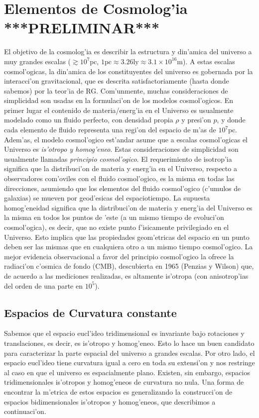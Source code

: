 \chapter{Elementos de Cosmolog'ia ***PRELIMINAR***}\label{cap:cosmo}
El objetivo de la cosmolog'ia es describir la estructura y din'amica del universo a muy grandes escalas ($\gtrsim 10^{7}\text{pc}$, $1\text{pc}\approx 3.26\text{ly}\approx 3.1\times 10^{16}\text{m}$). A estas escalas cosmol'ogicas, la din'amica de los constituyentes del universo es gobernada por la interacci'on gravitacional, que es descrita satisfactoriamente (hasta donde sabemos) por la teor'ia de RG.
Com'unmente, muchas consideraciones de simplicidad son usadas en la formulaci'on de los modelos cosmol'ogicos. 
En primer lugar el contenido de materia/energ'ia en el Universo es usualmente modelado como un fluido perfecto, 
con densidad propia $\rho$ y presi'on $p$, y donde cada elemento de fluido representa una regi'on del espacio de m'as de $10^{7}\text{pc}$. Adem'as, el modelo cosmol'ogico est'andar asume que a escalas cosmol'ogicas el Universo es \textit{is'otropo y homog'eneo}. Estas consideraciones de simplicidad son usualmente llamadas \textit{principio cosmol'ogico}. El requerimiento de isotrop'ia significa que la distribuci'on de materia y energ'ia en el Universo, respecto a observadores com'oviles con el fluido cosmol'ogico, es la misma en todas las direcciones, asumiendo que los elementos del fluido cosmol'ogico (c'umulos de galaxias) se mueven por geod'esicas del espaciotiempo.
La supuesta homog'eneidad significa que la distribuci'on de materia y energ'ia del Universo es la misma en todos los puntos de 'este (a un mismo tiempo de evoluci'on cosmol'ogica), es decir, que no existe punto f'isicamente privilegiado en el 
Universo. Esto implica que las propiedades geom'etricas del espacio en un punto deben ser las mismas que en cualquiera otro a un mismo tiempo cosmol'ogico.
La mejor evidencia observacional a favor del principio cosmol'ogico la ofrece la radiaci'on c'osmica de fondo (CMB), descubierta en 1965 (Penzias y Wilson) que, de acuerdo a las mediciones realizadas, es altamente is'otropa (con anisotrop'ias del orden de una parte en $10^5$).
\section{Espacios de Curvatura constante}
Sabemos que el espacio eucl'ideo tridimensional es invariante bajo rotaciones y translaciones, es decir, es is'otropo y homog'eneo. Esto lo hace un buen candidato para caracterizar la parte espacial del universo a grandes escalas. Por otro lado, el espacio eucl'ideo tiene curvatura igual a cero en toda su extensi'on y nos restringe al caso en que el universo es espacialmente plano. Existen, sin embargo, espacios tridimensionales is'otropos y homog'eneos de curvatura no nula. Una forma de encontrar la m'etrica de estos espacios es generalizando la construcci'on de espacios bidimensionales is'otropos y homog'eneos, que describimos a continuaci'on.

